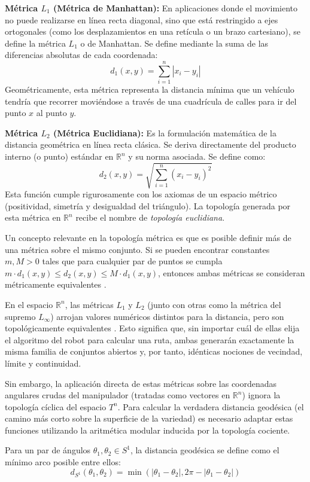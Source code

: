 \textbf{Métrica $L_1$ (Métrica de Manhattan):} En aplicaciones donde el movimiento no puede realizarse 
en línea recta diagonal, sino que está restringido a ejes ortogonales 
(como los desplazamientos en una retícula o un brazo cartesiano), se define la 
métrica $L_1$ o de Manhattan. Se define mediante la suma de las diferencias absolutas de cada 
coordenada:
$$ d_1(x, y) = \sum_{i=1}^n |x_i - y_i| $$
Geométricamente, esta métrica representa la distancia mínima que un vehículo tendría que 
recorrer moviéndose a través de una cuadrícula de calles para ir del punto $x$ al punto $y$.

\textbf{Métrica $L_2$ (Métrica Euclidiana):} Es la formulación matemática de la distancia 
geométrica en línea recta clásica. Se deriva directamente del producto interno (o punto) 
estándar en $\mathbb{R}^n$ y su norma asociada. Se define como:
$$ d_2(x, y) = \sqrt{\sum_{i=1}^n (x_i - y_i)^2} $$
Esta función cumple rigurosamente con los axiomas de un espacio métrico 
(positividad, simetría y desigualdad del triángulo). La topología generada por esta 
métrica en $\mathbb{R}^n$ recibe el nombre de \textit{topología euclidiana}.

Un concepto relevante en la topología métrica es que es posible definir más de una 
métrica sobre el mismo conjunto. Si se pueden encontrar constantes $m, M > 0$ tales que 
para cualquier par de puntos se cumpla $m \cdot d_1(x,y) \le d_2(x,y) \le M \cdot d_1(x,y)$, 
entonces ambas métricas se consideran métricamente equivalentes \parencite{waldmann2014topology}. 

En el espacio $\mathbb{R}^n$, las métricas $L_1$ y $L_2$ (junto con otras como la métrica 
del supremo $L_\infty$) arrojan valores numéricos distintos para la distancia, 
pero son topológicamente equivalentes \parencite{manetti2023topology}. Esto significa 
que, sin importar cuál de ellas elija 
el algoritmo del robot para calcular una ruta, ambas generarán exactamente la misma 
familia de conjuntos abiertos y, por tanto, idénticas nociones de vecindad, límite y continuidad.

Sin embargo, la aplicación directa de estas métricas sobre las coordenadas angulares 
crudas del manipulador (tratadas como vectores en $\mathbb{R}^n$) ignora la topología 
cíclica del espacio $T^n$. Para calcular la verdadera distancia geodésica (el camino más corto 
sobre la superficie de la variedad) es necesario adaptar estas funciones utilizando la 
aritmética modular inducida por la topología cociente.

Para un par de ángulos $\theta_1, \theta_2 \in S^1$, la distancia geodésica se define 
como el mínimo arco posible entre ellos:
$$ d_{S^1}(\theta_1, \theta_2) = \min(|\theta_1 - \theta_2|, 2\pi - |\theta_1 - \theta_2|) $$

